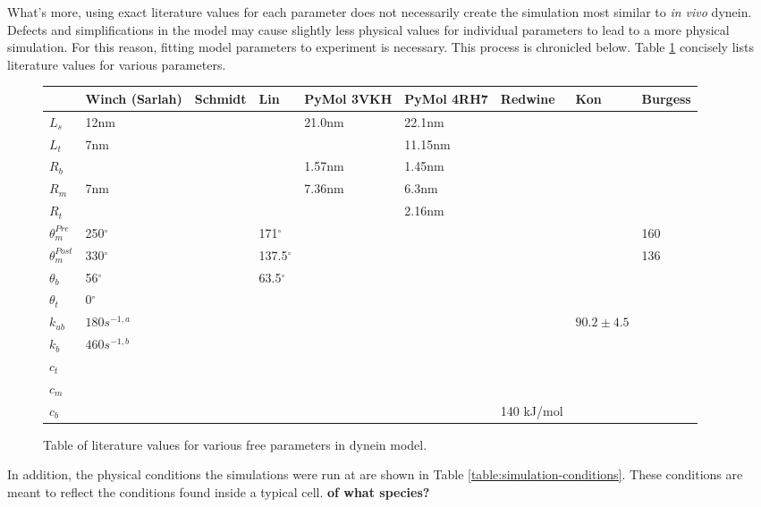 \documentclass[10pt]{article} %
\begin{document}
What's more, using exact literature values for each parameter does not necessarily create the simulation most similar to \textit{in vivo} dynein. Defects and simplifications in the model may cause slightly less physical values for individual parameters to lead to a more physical simulation. For this reason, fitting model parameters to experiment is necessary. This process is chronicled below. Table \ref{table:parameter-table} concisely lists literature values for various parameters.

\begin{figure}[h]
  \centering
  \begin{tabular}{| l | l | l | l | l | l | l | l | l |}
    \hline
    & Winch (Sarlah) & Schmidt & Lin & PyMol 3VKH & PyMol 4RH7 & Redwine & Kon & Burgess \\\hline
    $L_s$ & 12nm & & & 21.0nm & 22.1nm & & & \\ \hline
    $L_t$ &  7nm & & & & 11.15nm & & & \\ \hline
    $R_b$ &  & & & 1.57nm & 1.45nm & & & \\ \hline
    $R_m$ &  7nm & & & 7.36nm & 6.3nm & & & \\ \hline
    $R_t$ &  & & & & 2.16nm & & & \\ \hline
    $\theta_{m}^{Pre}$ & 250$^{\circ}$ & & 171$^{\circ}$ & & & & & 160\\ \hline
    $\theta_{m}^{Post}$ & 330$^{\circ}$ & & 137.5$^{\circ}$ & & & & & 136\\ \hline
    $\theta_{b}$ & 56$^{\circ}$ & & 63.5$^{\circ}$ & & & & & \\ \hline
    $\theta_{t}$ & 0$^{\circ}$ & & & & & & & \\ \hline
    $k_{ub}$ & $180 s^{-1,a}$ & & & & & & $90.2 \pm 4.5$& \\ \hline
    $k_b$ & $460 s^{-1,b}$ & & & & & & & \\ \hline
    $c_t$ & & & & & & & & \\ \hline
    $c_m$ & & & & & & & & \\ \hline
    $c_b$ & & & & & & 140 kJ/mol & & \\ \hline
  \end{tabular}
  \caption{Table of literature values for various free parameters in dynein model.}
  \label{table:parameter-table}
\end{figure}

In addition, the physical conditions the simulations were run at are shown in Table \ref{table:simulation-conditions}. These conditions are meant to reflect the conditions found inside a typical cell. \textbf{of what species?}\\
\end{document}
